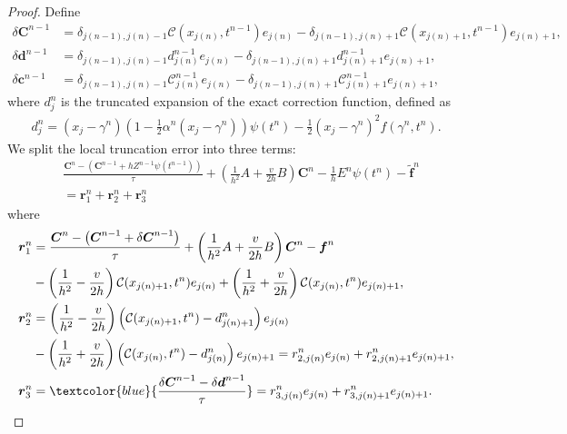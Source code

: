 \documentclass[11pt,reqno]{amsart}
\theoremstyle{plain}
\theoremstyle{definition}
\numberwithin{equation}{section}
\newcommand{\paren}[1]{\left(#1\right)}
\newcommand{\wt}[1]{\widetilde{#1}}
\newcommand{\bm}[1]{\boldsymbol{#1}}
\newcommand{\Corr}{\mathcal C}
\begin{document}
\begin{proof}
Define
\begin{align}
    \delta \bm C^{n-1} &= \delta_{j(n-1), j(n)-1} \Corr(x_{j(n)}, t^{n-1})  e_{j(n)} - \delta_{j(n-1),j(n)+1}\Corr(x_{j(n)+1}, t^{n-1}) e_{j(n)+1},\\
    \delta \bm d^{n-1} &= \delta_{j(n-1), j(n)-1} d_{j(n)}^{n-1}  e_{j(n)} - \delta_{j(n-1),j(n)+1}d_{j(n)+1}^{n-1} e_{j(n)+1},\\
    \delta \bm c^{n-1} &= \delta_{j(n-1), j(n)-1} \Corr_{j(n)}^{n-1}  e_{j(n)} - \delta_{j(n-1),j(n)+1}\Corr_{j(n)+1}^{n-1} e_{j(n)+1},
\end{align}
where $d_j^n$ is the truncated expansion of the exact correction function, defined as
\begin{equation}
\begin{aligned}
    d^n_j = \paren{x_j-\gamma^n} \paren{ 1-\frac{1}{2} \alpha^n\paren{x_j-\gamma^n}}\psi(t^n) - \frac{1}{2}\paren{x_j-\gamma^n}^2 f(\gamma^n, t^n).
\end{aligned}
\end{equation}
We split the local truncation error into three terms:
\begin{equation}
\begin{aligned}
    & \frac{\bm C^n - \paren{\bm C^{n-1} + h Z^{n-1} \psi(t^{n-1})} }{\tau} + \paren{\frac{1}{h^2}A + \frac{v}{2h}B} \bm C^n - \frac{1}{h}E^n \psi(t^n) -\wt{\bm f}^n\\
    &= \bm r_1^n + \bm r_2^n + \bm r_3^n
\end{aligned}
\end{equation}
where
\begin{align}
\bm r_1^n & = \frac{\bm C^n - \paren{\bm C^{n-1} + \delta \bm C^{n-1} } }{\tau} + \paren{\frac{1}{h^2}A + \frac{v}{2h}B} \bm C^n - \bm f^n \nonumber\\
& - \paren{\frac{1}{h^2} -\frac{v}{2h}}\Corr(x_{j(n)+1}, t^n) e_{j(n)}  + \paren{\frac{1}{h^2}+\frac{v}{2h}} \Corr(x_{j(n)}, t^n) e_{j(n)+1},\\
\bm r_2^n &= \paren{\frac{1}{h^2} -\frac{v}{2h}}\paren{\Corr(x_{j(n)+1}, t^n) - d_{j(n)+1}^n} e_{j(n)}\nonumber \\
&- \paren{\frac{1}{h^2} + \frac{v}{2h}} \paren{ \Corr(x_{j(n)}, t^n) - d_{j(n)}^n} e_{j(n)+1} = r_{2,j(n)}^n e_{j(n)} + r_{2,j(n)+1}^n e_{j(n)+1} ,\\
\bm r_3^n &= \textcolor{blue}{\frac{\delta \bm C^{n-1} - \delta \bm d^{n-1}}{\tau}} = r_{3,j(n)}^n e_{j(n)} + r_{3,j(n)+1}^n e_{j(n)+1} .
\end{align}

\end{proof}
\end{document}
